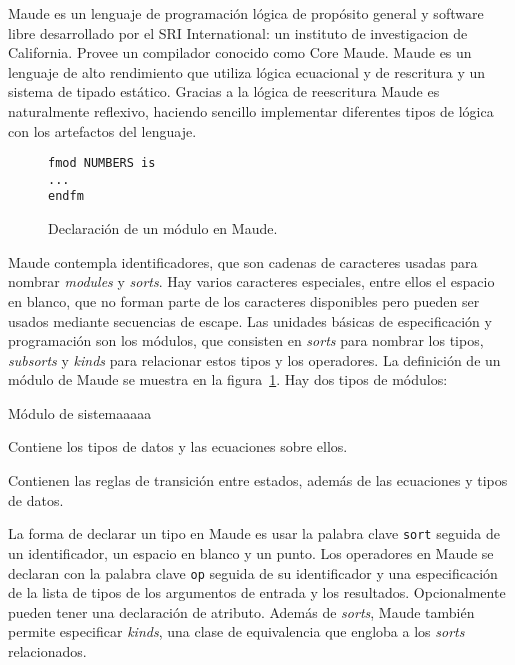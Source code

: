 \documentclass[11pt,captions=nooneline,DIV=14, parskip=full]{scrartcl}
\begin{document}
Maude es un lenguaje de programación lógica de propósito general y software libre desarrollado por el SRI International: un instituto de investigacion de California. Provee un compilador conocido como Core Maude. Maude es un lenguaje de alto rendimiento que utiliza lógica ecuacional y de rescritura y un sistema de tipado estático. Gracias a la lógica de reescritura Maude es naturalmente reflexivo, haciendo sencillo implementar diferentes tipos de lógica con los artefactos del lenguaje.

\begin{figure}[!htbp]
\begin{lstlisting}[frame=single]
fmod NUMBERS is
...
endfm
\end{lstlisting} 
\caption{Declaración de un módulo en Maude.}
\label{fig:maudemods}
\end{figure}

Maude contempla identificadores, que son cadenas de caracteres usadas para nombrar \textit{modules} y \textit{sorts}. Hay varios caracteres especiales, entre ellos el espacio en blanco, que no forman parte de los caracteres disponibles pero pueden ser usados mediante secuencias de escape. Las unidades básicas de especificación y programación son los módulos, que consisten en \textit{sorts} para nombrar los tipos, \textit{subsorts} y \textit{kinds} para relacionar estos tipos y los operadores. La definición de un módulo de Maude se muestra en la figura~\ref{fig:maudemods}. Hay dos tipos de módulos:

\begin{labeling}{Módulo de sistemaaaaa}
\item [\textbf{Módulo funcional}] Contiene los tipos de datos y las ecuaciones sobre ellos.
\item [\textbf{Módulo de sistema}] Contienen las reglas de transición entre estados, además de las ecuaciones y tipos de datos.
\end{labeling}

La forma de declarar un tipo en Maude es usar la palabra clave \texttt{sort} seguida de un identificador, un espacio en blanco y un punto. Los operadores en Maude se declaran con la palabra clave \texttt{op} seguida de su identificador y una especificación de la lista de tipos de los argumentos de entrada y los resultados. Opcionalmente pueden tener una declaración de atributo. 
Además de \textit{sorts}, Maude también permite especificar \textit{kinds}, una clase de equivalencia que engloba a los \textit{sorts} relacionados.
\end{document}
